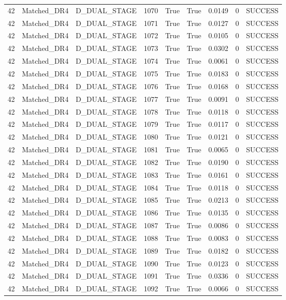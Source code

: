 \documentclass[11pt,a4paper,oneside]{book}
\begin{document}
\begin{longtable}{l l l l l l l l l}
42 & Matched\_DR4 & D\_DUAL\_STAGE & 1070 & True & True & 0.0149 & 0 & SUCCESS \\
42 & Matched\_DR4 & D\_DUAL\_STAGE & 1071 & True & True & 0.0127 & 0 & SUCCESS \\
42 & Matched\_DR4 & D\_DUAL\_STAGE & 1072 & True & True & 0.0105 & 0 & SUCCESS \\
42 & Matched\_DR4 & D\_DUAL\_STAGE & 1073 & True & True & 0.0302 & 0 & SUCCESS \\
42 & Matched\_DR4 & D\_DUAL\_STAGE & 1074 & True & True & 0.0061 & 0 & SUCCESS \\
42 & Matched\_DR4 & D\_DUAL\_STAGE & 1075 & True & True & 0.0183 & 0 & SUCCESS \\
42 & Matched\_DR4 & D\_DUAL\_STAGE & 1076 & True & True & 0.0168 & 0 & SUCCESS \\
42 & Matched\_DR4 & D\_DUAL\_STAGE & 1077 & True & True & 0.0091 & 0 & SUCCESS \\
42 & Matched\_DR4 & D\_DUAL\_STAGE & 1078 & True & True & 0.0118 & 0 & SUCCESS \\
42 & Matched\_DR4 & D\_DUAL\_STAGE & 1079 & True & True & 0.0117 & 0 & SUCCESS \\
42 & Matched\_DR4 & D\_DUAL\_STAGE & 1080 & True & True & 0.0121 & 0 & SUCCESS \\
42 & Matched\_DR4 & D\_DUAL\_STAGE & 1081 & True & True & 0.0065 & 0 & SUCCESS \\
42 & Matched\_DR4 & D\_DUAL\_STAGE & 1082 & True & True & 0.0190 & 0 & SUCCESS \\
42 & Matched\_DR4 & D\_DUAL\_STAGE & 1083 & True & True & 0.0161 & 0 & SUCCESS \\
42 & Matched\_DR4 & D\_DUAL\_STAGE & 1084 & True & True & 0.0118 & 0 & SUCCESS \\
42 & Matched\_DR4 & D\_DUAL\_STAGE & 1085 & True & True & 0.0213 & 0 & SUCCESS \\
42 & Matched\_DR4 & D\_DUAL\_STAGE & 1086 & True & True & 0.0135 & 0 & SUCCESS \\
42 & Matched\_DR4 & D\_DUAL\_STAGE & 1087 & True & True & 0.0086 & 0 & SUCCESS \\
42 & Matched\_DR4 & D\_DUAL\_STAGE & 1088 & True & True & 0.0083 & 0 & SUCCESS \\
42 & Matched\_DR4 & D\_DUAL\_STAGE & 1089 & True & True & 0.0182 & 0 & SUCCESS \\
42 & Matched\_DR4 & D\_DUAL\_STAGE & 1090 & True & True & 0.0123 & 0 & SUCCESS \\
42 & Matched\_DR4 & D\_DUAL\_STAGE & 1091 & True & True & 0.0336 & 0 & SUCCESS \\
42 & Matched\_DR4 & D\_DUAL\_STAGE & 1092 & True & True & 0.0066 & 0 & SUCCESS \\
\bottomrule \end{longtable}
\end{document}
